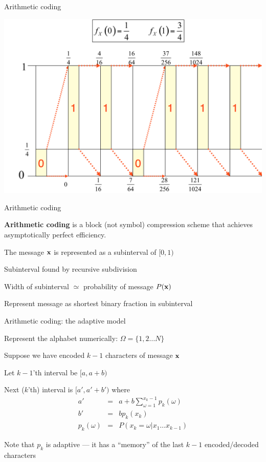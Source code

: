 \documentclass{beamer}
\begin{document}
\begin{frame}{Arithmetic coding}

 \centerline{ \includegraphics[height=.8\textheight]{Arithmetic_coding.png} }

\end{frame}

\begin{frame}{Arithmetic coding}
 \itemb
\item {\bf Arithmetic coding} is a block (not symbol) compression scheme that achieves asymptotically perfect efficiency.
\item The message ${\bf x}$ is represented as a subinterval of $[0,1)$
\itemb
 \item Subinterval found by recursive subdivision
 \item Width of subinterval $\simeq$ probability of message $P({\bf x})$
\iteme
\item Represent message as shortest binary fraction in subinterval
\iteme

\end{frame}


\begin{frame}{Arithmetic coding: the adaptive model}

\itemb
\item Represent the alphabet numerically: $\Omega = \{ 1, 2 \ldots N \}$
\item Suppose we have encoded $k-1$ characters of message ${\bf x}$
\item Let $k-1$'th interval be $[a,a+b)$
\item Next ($k$'th) interval is $[a',a'+b')$ where
\begin{eqnarray*}
a' & = & a + b \sum_{\omega=1}^{x_k - 1} p_k(\omega) \\
b' & = & b p_k(x_k) \\
p_k(\omega) & = & P(x_k = \omega | x_1 \ldots x_{k-1})
\end{eqnarray*}
\item Note that $p_k$ is \alert{adaptive} --- it has a ``memory'' of the last $k-1$ encoded/decoded characters
\iteme

\end{frame}
\end{document}
